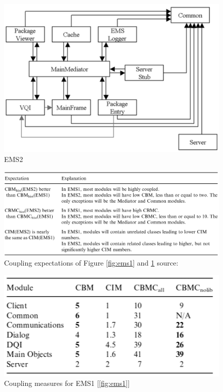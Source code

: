 \documentclass[15pt]{article}
\begin{document}
\begin{figure}
	\includegraphics[scale=0.45]{ems2.png} 
	\caption{EMS2 \cite{lindvall_empirically-based_2003}}
	\label{fig:ems2}
\end{figure}


\begin{figure}
	\includegraphics[scale=0.29]{emsExpectations.png} 
	\caption{Coupling expectations of Figure \ref{fig:ems1} and \ref{fig:ems2} source:\cite{lindvall_empirically-based_2003}}
	\label{fig:emsExpectations}
\end{figure}


\begin{figure}
	\includegraphics[scale=0.7]{ems1Table.png} 
	\caption{Coupling measures for EMS1 [\ref{fig:ems1}] \cite{lindvall_empirically-based_2003}}
	\label{fig:ems1Table}
\end{figure}
\end{document}
